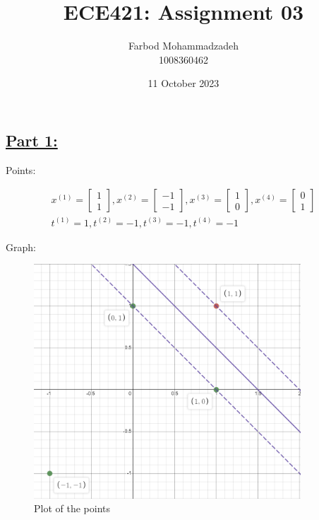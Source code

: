 \documentclass[20pt]{article}
\title{ECE421: Assignment 03}
\author{Farbod Mohammadzadeh\\
    1008360462}
\date{11 October 2023}
\begin{document}
\Large


\maketitle

\newpage

\section{}

\subsection*{\underline{Part 1:}}

Points:

\begin{eqnarray}
    x^{(1)} =  \begin{bmatrix}
        1 \\
        1
    \end{bmatrix},
    x^{(2)} = \begin{bmatrix}
        -1 \\
        -1
    \end{bmatrix},
    x^{(3)} = \begin{bmatrix}
        1 \\
        0
    \end{bmatrix},
    x^{(4)} = \begin{bmatrix}
        0 \\
        1
    \end{bmatrix} \\
    t^{(1)} = 1, t^{(2)} = -1, t^{(3)} = -1, t^{(4)} = -1
\end{eqnarray}

Graph:
\begin{figure}[h]
    \centering
    \includegraphics[width=10cm]{desmos-graph}
    \caption{Plot of the points}
    \label{fig:points}
\end{figure}
\end{document}
